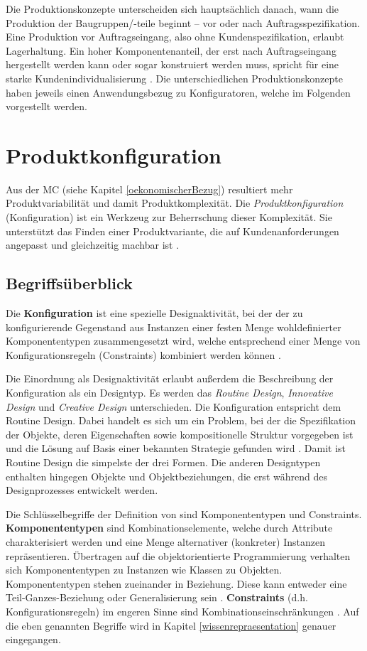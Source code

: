 \documentclass[11pt, a4paper, titlepage, listof=totoc, bibliography=totoc, index=totoc, twoside, openright, headings=normal, draft]{scrreprt}
\begin{document}
Die Produktionskonzepte unterscheiden sich hauptsächlich danach, wann die Produktion der Baugruppen/-teile beginnt -- vor oder nach Auftragsspezifikation. Eine Produktion vor Auftragseingang, also ohne Kundenspezifikation, erlaubt Lagerhaltung. Ein hoher Komponentenanteil, der erst nach Auftragseingang hergestellt werden kann oder sogar konstruiert werden muss, spricht für eine starke Kundenindividualisierung \citep{lutz11}. Die unterschiedlichen Produktionskonzepte haben jeweils einen Anwendungsbezug zu Konfiguratoren, welche im Folgenden vorgestellt werden.

\section{Produktkonfiguration}
\label{Produktkonfiguration}
 
Aus der \ac{MC} (siehe Kapitel \ref{oekonomischerBezug}) resultiert mehr Produktvariabilität und damit Produktkomplexität. Die \emph{Produktkonfiguration} (Konfiguration) ist ein Werkzeug zur Beherrschung dieser Komplexität. Sie unterstützt das Finden einer Produktvariante, die auf Kundenanforderungen angepasst und gleichzeitig machbar ist \citep{lutz11}.

\subsection{Begriffsüberblick}
\label{begriffsuberblick}
Die \textbf{Konfiguration} ist eine spezielle Designaktivität, bei der der zu konfigurierende Gegenstand aus Instanzen einer festen Menge wohldefinierter Komponententypen zusammengesetzt wird, welche entsprechend einer Menge von Konfigurationsregeln (Constraints) kombiniert werden können \citep{sabin98}.

Die Einordnung als Designaktivität erlaubt außerdem die Beschreibung der Konfiguration als ein Designtyp. Es werden das \emph{Routine Design}, \emph{Innovative Design} und \emph{Creative Design} unterschieden. Die Konfiguration entspricht dem Routine Design. Dabei handelt es sich um ein Problem, bei der die Spezifikation der Objekte, deren Eigenschaften sowie kompositionelle Struktur vorgegeben ist und die Lösung auf Basis einer bekannten Strategie gefunden wird \citep{brown89}. Damit ist Routine Design die simpelste der drei Formen. Die anderen Designtypen enthalten hingegen Objekte und Objektbeziehungen, die erst während des Designprozesses entwickelt werden.

Die Schlüsselbegriffe der Definition von \citeauthor{sabin98} sind Komponententypen und Constraints. \textbf{Komponententypen} sind Kombinationselemente, welche durch Attribute charakterisiert werden und eine Menge alternativer (konkreter) Instanzen repräsentieren. Übertragen auf die objektorientierte Programmierung verhalten sich Komponententypen zu Instanzen wie Klassen zu Objekten. Komponententypen stehen zueinander in Beziehung. Diese kann entweder eine \glqq Teil-Ganzes\grqq{}-Beziehung oder Generalisierung sein \citep{felferning14}. \textbf{Constraints} (d.h. Konfigurationsregeln) im engeren Sinne sind Kombinationseinschränkungen \citep{felferning14}. Auf die eben genannten Begriffe wird in Kapitel \ref{wissenrepraesentation} genauer eingegangen.
\end{document}

